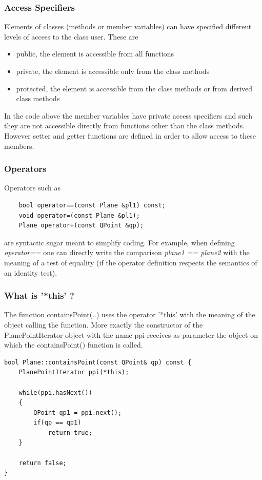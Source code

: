 \documentclass{article}
\begin{document}
\subsubsection {Access Specifiers}
Elements of classes (methods or member variables) can have specified different levels of access to the class user. These are 
\begin{itemize}
\item public, the element is accessible from all functions
\item private, the element is accessible only from the class methods
\item protected, the element is accessible from the class methods or from derived class methods
\end{itemize}  
In the code above the member variables have private access specifiers and such they are not accessible directly from functions other than the class methods. However setter and getter functions are defined in order to allow access to these members. 

\subsubsection {Operators}
Operators such as
\begin{lstlisting}
    bool operator==(const Plane &pl1) const;
    void operator=(const Plane &pl1);
    Plane operator+(const QPoint &qp);
\end{lstlisting}
are syntactic sugar meant to simplify coding. For example, when defining \textit{operator==} one can directly write the comparison \textit{ plane1 == plane2 } with the meaning of a test of equality (if the operator definition respects the semantics of an identity test). 

\subsubsection {What is '*this' ? }
The function containsPoint(..) uses the operator '*this' with the meaning of the object calling the function. More exactly the constructor of the PlanePointIterator object with the name ppi receives as parameter the object on which the containsPoint() function is called.

\begin{lstlisting}
bool Plane::containsPoint(const QPoint& qp) const {
    PlanePointIterator ppi(*this);

    while(ppi.hasNext())
    {
        QPoint qp1 = ppi.next();
        if(qp == qp1)
            return true;
    }

    return false;
}
\end{lstlisting}
\end{document}
